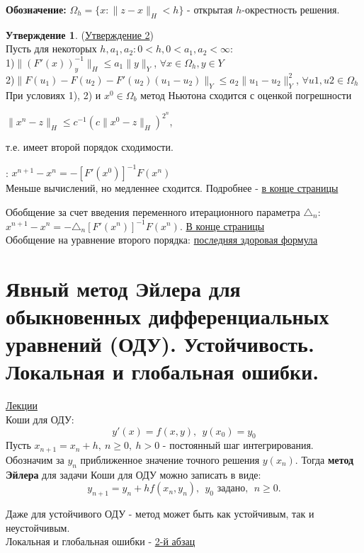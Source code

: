 \documentclass[specialist, subf, href, colorlinks=true, 12pt, times, mtpro, final]{disser}
\theoremstyle{definition}
\newtheorem{state}{Утверждение}[section]
\begin{document}
{\noindent\textbf{Обозначение:} $\Omega_h = \{x: \|z-x\|_H < h\}$ - открытая $h$-окрестность решения.

\begin{state}(\hyperlink {lects.84}{Утверждение 2})\\
Пусть для некоторых $h,a_1,a_2: 0 <h, 0<a_1,a_2<\infty$:\\
1)$\|(F'(x))^{-1}_y\|_H \leq a_1\|y\|_Y$, $\forall x \in \Omega_h, y \in Y$\\
2)$\|F(u_1)-F(u_2) - F'(u_2)(u_1-u_2)\|_Y \leq a_2\|u_1-u_2\|^2_Y$, $\forall u1,u2 \in \Omega_h$\\
При условиях 1), 2) и $x^0 \in \Omega_b$ метод Ньютона сходится с оценкой погрешности 
\begin{center}
$\|x^n-z\|_H \leq c^{-1} (c\| x^0 - z\|_H)^{2^n}$, 
\end{center} т.е. имеет второй порядок сходимости.
\end{state}

: 
$x^{n+1} - x^n = -[F'(x^0)]^{-1}F(x^n)$ \\
Меньше вычислений, но медленнее сходится. Подробнее - \hyperlink {lects.84}{в конце страницы}


Обобщение за счет введения переменного итерационного параметра $\triangle_n$: $x^{n+1} - x^n= -\triangle_n [F'(x^n)]^{-1}F(x^n)$. \hyperlink {lects.85}{В конце страницы}\\
Обобщение на уравнение второго порядка: \hyperlink {lects.86}{последняя здоровая формула}

    

\section {Явный метод Эйлера для обыкновенных дифференциальных уравнений (ОДУ). Устойчивость. Локальная и глобальная ошибки.}
    \hyperlink {lects.87}{Лекции}\\
    { Коши} для ОДУ: 
    $$y'(x)=f(x,y),\ \  y(x_0) = y_0$$
    Пусть $x_{n+1} = x_n + h,\  n \geq 0,\  h > 0$ - постоянный шаг интегрирования. Обозначим за $y_n$ приближенное значение точного решения $y(x_n)$. Тогда {\bf метод Эйлера} для задачи Коши для ОДУ можно записать в виде:
$$
    y_{n+1} = y_n + h f(x_n, y_n),\ \  y_0 \text{ задано},\ \  n \geq 0.
$$

Даже для устойчивого ОДУ -  метод может быть как устойчивым, так и неустойчивым.\\
Локальная и глобальная ошибки - \hyperlink {lects.88}{2-й абзац}


}
\end{document}
